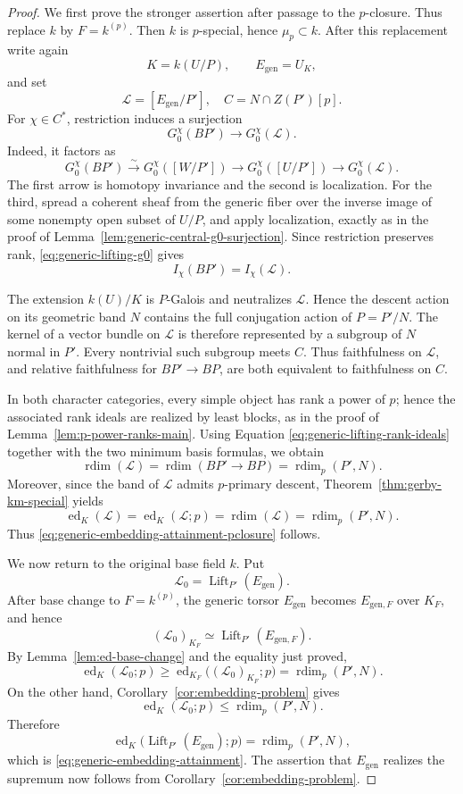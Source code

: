 \documentclass[10pt,a4paper]{amsart}
\def\cL{{\mathcal L}}
\def\ed{{\operatorname{ed}}}
\def\ra{{\rightarrow}}
\def\rdim{{\operatorname{rdim}}}
\begin{document}
\begin{proof}
We first prove the stronger assertion after passage to the $p$-closure.
Thus replace $k$ by $F=k^{(p)}$.  Then $k$ is $p$-special, hence
$\mu_p\subset k$.  After this replacement write again
\[
K=k(U/P),
\qquad
E_{\mathrm{gen}}=U_K,
\]
and set
\[
\cL=[E_{\mathrm{gen}}/P'],
\quad C=N\cap Z(P')[p].
\]
For $\chi\in C^*$, restriction induces a surjection
\begin{equation}\label{eq:generic-lifting-g0}
G_0^\chi(BP')\ra G_0^\chi(\cL).
\end{equation}
Indeed, it factors as
\[
G_0^\chi(BP')
\xrightarrow{\sim}G_0^\chi([W/P'])
\ra G_0^\chi([U/P'])
\ra G_0^\chi(\cL).
\]
The first arrow is homotopy invariance and the second is localization.
For the third, spread a coherent sheaf from the generic fiber over the
inverse image of some nonempty open subset of $U/P$, and apply localization,
exactly as in the proof of
Lemma~\ref{lem:generic-central-g0-surjection}.  Since restriction preserves rank,
\eqref{eq:generic-lifting-g0} gives
\begin{equation}\label{eq:generic-lifting-rank-ideals}
I_\chi(BP')=I_\chi(\cL).
\end{equation}

The extension $k(U)/K$ is $P$-Galois and neutralizes $\cL$.  Hence
the descent action on its geometric band $N$ contains the full
conjugation action of $P=P'/N$.  The kernel of a vector bundle on
$\cL$ is therefore represented by a subgroup of $N$ normal in
$P'$.  Every nontrivial such subgroup meets $C$.  Thus faithfulness on
$\cL$, and relative faithfulness for $BP'\to BP$, are both equivalent
to faithfulness on $C$.

In both character categories, every simple object has rank a power of $p$; hence the associated rank ideals are realized by least blocks, as in the proof of Lemma~\ref{lem:p-power-ranks-main}.  Using Equation \eqref{eq:generic-lifting-rank-ideals} together with the two minimum basis formulas, we obtain
\[
\rdim(\cL)=\rdim(BP'\to BP)=\rdim_p(P',N).
\]
Moreover, since the band of $\cL$ admits $p$-primary descent, Theorem~\ref{thm:gerby-km-special} yields
\[
\ed_K(\cL)=\ed_K(\cL;p)=\rdim(\cL)=\rdim_p(P',N).
\]
Thus \eqref{eq:generic-embedding-attainment-pclosure} follows.

We now return to the original base field $k$.  Put
\[
\cL_0=\operatorname{Lift}_{P'}(E_{\mathrm{gen}}).
\]
After base change to $F=k^{(p)}$, the generic torsor
$E_{\mathrm{gen}}$ becomes $E_{\mathrm{gen},F}$ over $K_F$, and hence
\[
(\cL_0)_{K_F}\simeq
\operatorname{Lift}_{P'}(E_{\mathrm{gen},F}).
\]
By Lemma~\ref{lem:ed-base-change} and the equality just proved,
\[
\ed_K(\cL_0;p)
\ge
\ed_{K_F}\bigl((\cL_0)_{K_F};p\bigr)
=
\rdim_p(P',N).
\]
On the other hand, Corollary~\ref{cor:embedding-problem} gives
\[
\ed_K(\cL_0;p)\le \rdim_p(P',N).
\]
Therefore
\[
\ed_K\bigl(\operatorname{Lift}_{P'}(E_{\mathrm{gen}});p\bigr)
=\rdim_p(P',N),
\]
which is \eqref{eq:generic-embedding-attainment}.  The assertion that
$E_{\mathrm{gen}}$ realizes the supremum now follows from
Corollary~\ref{cor:embedding-problem}.
\end{proof}
\end{document}
